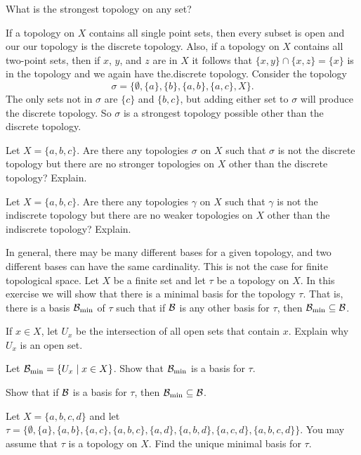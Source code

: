 \item What is the strongest topology on any set?

\item If a topology on $X$ contains all single point sets, then every subset is open and our our topology is the discrete topology. Also, if a topology on $X$ contains all two-point sets, then if $x$, $y$, and $z$ are in $X$ it follows that $\{x,y\} \cap \{x,z\} = \{x\}$ is in the topology and we again have the.discrete topology. Consider the topology
	\[\sigma = \{\emptyset, \{a\}, \{b\}, \{a,b\}, \{a,c\}, X\}.\]
The only sets not in $\sigma$ are $\{c\}$ and $\{b,c\}$, but adding either set to $\sigma$ will produce the discrete topology. So $\sigma$ is a strongest topology possible other than the discrete topology.	

\item Let $X = \{a,b,c\}$. Are there any topologies $\sigma$ on $X$ such that $\sigma$ is not the discrete topology but there are no stronger topologies on $X$ other than the discrete topology? Explain. 

\item Let $X = \{a,b,c\}$.  Are there any topologies $\gamma$ on $X$ such that $\gamma$ is not the indiscrete topology but there are no weaker topologies on $X$ other than the indiscrete topology? Explain.

\item In general, there may be many different bases for a given topology, and two different bases can have the same cardinality. This is not the case for finite topological space. Let $X$ be a finite set and let $\tau$ be a topology on $X$. In this exercise we will show that there is a minimal basis for the topology $\tau$. That is, there is a basis $\mathcal{B}_{\text{min}}$ of $\tau$ such that if $\mathcal{B}$ is any other basis for $\tau$, then $\mathcal{B}_{\text{min}} \subseteq \mathcal{B}$.

\ba

\item If $x \in X$, let $U_x$ be the intersection of all open sets that contain $x$. Explain why $U_x$ is an open set.

\item Let $\mathcal{B}_{\text{min}} = \{U_x \mid x \in X\}$. Show that $\mathcal{B}_{\text{min}}$ is a basis for $\tau$. 

\item Show that if $\mathcal{B}$ is a basis for $\tau$, then $\mathcal{B}_{\text{min}} \subseteq \mathcal{B}$. 

\item Let $X = \{a,b,c,d\}$ and let $\tau = \{\emptyset, \{a\}, \{a, b\}, \{a, c\}, \{a, b, c\}, \{a, d\}, \{a, b, d\}, \{a, c, d\}, \{a, b, c, d\}\}$. You may assume that $\tau$ is a topology on $X$. Find the unique minimal basis for $\tau$. 

